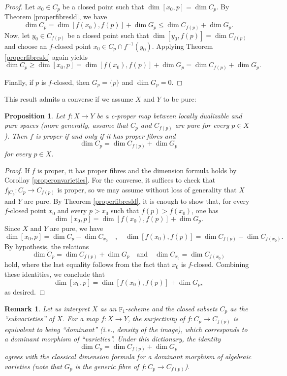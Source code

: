 \documentclass[amssymb,amscd,11pt,20pt]{amsart}
\newcommand{\FF}{{\mathtt F}}
\newcommand{\0}{\mathbf 0}
\theoremstyle{plain}
\newtheorem{prop}[thm]{Proposition}
\newtheorem{rem}[thm]{Remark}
\numberwithin{equation}{thm}
\begin{document}
\begin{proof} Let $x_0\in C_p$ be a closed point such that $\dim [x_0,p]=\dim C_p$. By Theorem \ref{properfibresld}, we have
\[ \dim C_p =\dim [f(x_0),f(p)] +\dim G_p \leq \dim C_{f(p)}+\dim G_p.\]
Now, let $y_0\in C_{f(p)}$ be a closed point such that $\dim [y_0,f(p)]=\dim C_{f(p)}$ and choose an $f$-closed point $x_0\in C_p\cap f^{-1}(y_0)$. Applying Theorem \ref{properfibresld} again yields
\[ \dim C_p\geq \dim [x_0,p]=\dim [f(x_0),f(p)] +\dim G_p  = \dim C_{f(p)}+\dim G_p.\]

Finally, if $p$ is $f$-closed, then $G_p=\{p\}$ and $\dim G_p=0$.
\end{proof}

This result admits a converse if we assume $X$ and $Y$ to be pure:

\begin{prop}\label{proper-formula} Let $f\colon X\to Y$ be a c-proper map between locally dualizable and pure spaces (more generally, assume that $C_p$ and $C_{f(p)}$ are pure for every $p\in X$). Then $f$ is proper if and only if it has proper fibres and
\[ \dim C_p=\dim C_{f(p)}+\dim G_p \] for every $p\in X$.
\end{prop}
\begin{proof} If $f$ is proper,  it has proper fibres and the dimension formula holds by Corollay  \ref{properonvarieties}. For the converse, it suffices to check that $f_{\vert C_p}\colon C_p\to C_{f(p)}$ is proper, so we may assume without loss of generality that  $X$ and $Y$ are pure. By Theorem  \ref{properfibresld}, it is enough to show that, for every    $f$-closed point $x_0$ and every $p>x_0$ such that $f(p)>f(x_0)$, one has 
\[\dim [x_0,p]=\dim [f(x_0),f(p)] + \dim G_p. \]  
Since $X$ and $Y$ are pure, we have
\[ \dim [x_0,p]=\dim C_p-\dim C_{x_0}\quad ,\quad \dim[f(x_0),f(p)]=\dim C_{f(p)}-\dim C_{f(x_0)}.\]
By hypothesis, the relations
\[ \dim C_p = \dim C_{f(p)} + \dim G_p \quad \text{and} \quad \dim C_{x_0} = \dim C_{f(x_0)} \]
hold, where the last equality follows from the fact that $x_0$ is $f$-closed.  Combining these identities, we conclude that  
\[\dim [x_0,p]=\dim [f(x_0),f(p)] + \dim G_p, \] as desired.
\end{proof}

\begin{rem} {\rm Let us interpret $X$ as an $\FF_1$-scheme and the closed subsets $C_p$ as the ``subvarieties'' of $X$. For a map $f\colon X\to Y$, the surjectivity of $f\colon C_p\to C_{f(p)}$ is equivalent to being ``dominant''  (i.e., density of the image), which corresponds to a dominant morphism of ``varieties''. Under this dictionary, the identity 
$$\dim C_p=\dim C_{f(p)}+\dim G_p$$ agrees with the classical dimension formula for a dominant morphism of algebraic varieties (note that $G_p$ is the generic fibre of $f\colon C_p\to C_{f(p)}$).}
\end{rem}
\end{document}
